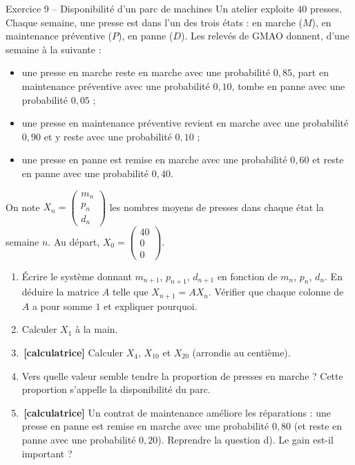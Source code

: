 \documentclass[a4paper,11pt]{article}
\newcommand{\M}[1]{\begin{pmatrix}#1\end{pmatrix}}
\newcommand{\calc}{\,{\color{uimmred}\small\textbf{[calculatrice]}}}
\begin{document}
\begin{exo}{Exercice 9 -- Disponibilité d'un parc de machines}
\label{exo:9}
Un atelier exploite $40$ presses. Chaque semaine, une presse est dans l'un des trois états : en marche ($M$), en maintenance préventive ($P$), en panne ($D$). Les relevés de GMAO donnent, d'une semaine à la suivante :
\begin{itemize}
  \item une presse en marche reste en marche avec une probabilité $0{,}85$, part en maintenance préventive avec une probabilité $0{,}10$, tombe en panne avec une probabilité $0{,}05$ ;
  \item une presse en maintenance préventive revient en marche avec une probabilité $0{,}90$ et y reste avec une probabilité $0{,}10$ ;
  \item une presse en panne est remise en marche avec une probabilité $0{,}60$ et reste en panne avec une probabilité $0{,}40$.
\end{itemize}
On note $X_n = \M{m_n\\p_n\\d_n}$ les nombres moyens de presses dans chaque état la semaine $n$. Au départ, $X_0 = \M{40\\0\\0}$.
\begin{enumerate}[label=\alph*)]
  \item Écrire le système donnant $m_{n+1}$, $p_{n+1}$, $d_{n+1}$ en fonction de $m_n$, $p_n$, $d_n$. En déduire la matrice $A$ telle que $X_{n+1} = AX_n$. Vérifier que chaque colonne de $A$ a pour somme $1$ et expliquer pourquoi.
  \item Calculer $X_1$ à la main.
  \item \calc{} Calculer $X_4$, $X_{10}$ et $X_{20}$ (arrondis au centième).
  \item Vers quelle valeur semble tendre la proportion de presses en marche ? Cette proportion s'appelle la disponibilité du parc.
  \item \calc{} Un contrat de maintenance améliore les réparations : une presse en panne est remise en marche avec une probabilité $0{,}80$ (et reste en panne avec une probabilité $0{,}20$). Reprendre la question d). Le gain est-il important ?
\end{enumerate}
\end{exo}
\end{document}

